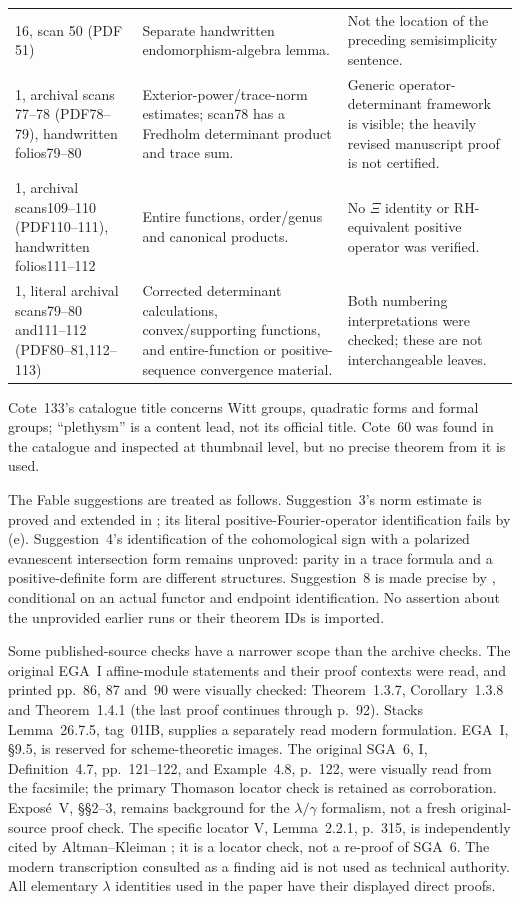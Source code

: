 {\begin{longtable}{p{.19\linewidth}p{.36\linewidth}p{.37\linewidth}}
16, scan 50 (PDF 51)&Separate handwritten endomorphism-algebra lemma.&Not the location of the preceding semisimplicity sentence.\\
1, archival scans 77--78 (PDF78--79), handwritten folios79--80&Exterior-power/trace-norm estimates; scan78 has a Fredholm determinant product and trace sum.&Generic operator-determinant framework is visible; the heavily revised manuscript proof is not certified.\\
1, archival scans109--110 (PDF110--111), handwritten folios111--112&Entire functions, order/genus and canonical products.&No $\Xi$ identity or RH-equivalent positive operator was verified.\\
1, literal archival scans79--80 and111--112 (PDF80--81,112--113)&Corrected determinant calculations, convex/supporting functions, and entire-function or positive-sequence convergence material.&Both numbering interpretations were checked; these are not interchangeable leaves.\\\bottomrule
\end{longtable}}
Cote~133's catalogue title concerns Witt groups, quadratic forms and formal groups; ``plethysm'' is a content lead, not its official title. Cote~60 was found in the catalogue and inspected at thumbnail level, but no precise theorem from it is used.

The Fable suggestions are treated as follows. Suggestion~3's norm estimate is proved and extended in ; its literal positive-Fourier-operator identification fails by (e). Suggestion~4's identification of the cohomological sign with a polarized evanescent intersection form remains unproved: parity in a trace formula and a positive-definite form are different structures. Suggestion~8 is made precise by , conditional on an actual functor and endpoint identification. No assertion about the unprovided earlier runs or their theorem IDs is imported.

Some published-source checks have a narrower scope than the archive checks.
The original EGA~I affine-module statements and their proof
contexts were read, and printed pp.~86, 87 and~90 were visually
checked: Theorem~1.3.7, Corollary~1.3.8 and Theorem~1.4.1
(the last proof continues through p.~92). Stacks Lemma~26.7.5,
tag~01IB, supplies a separately read modern formulation.
EGA~I, \S9.5, is reserved for scheme-theoretic images.
The original SGA~6, I, Definition~4.7, pp.~121--122, and
Example~4.8, p.~122, were visually read from the facsimile;
the primary Thomason locator check
\cite[\S3.1, pp.~8--9]{ThomasonPerfect} is retained as
corroboration. Expos\'e~V, \S\S2--3, remains background for
the $\lambda/\gamma$ formalism, not a fresh original-source
proof check. The specific locator V, Lemma~2.2.1, p.~315, is independently cited by Altman--Kleiman \cite[\S2.10]{AK}; it is a locator check, not a re-proof of SGA~6. The modern transcription consulted as a finding aid is not used as technical authority. All elementary $\lambda$ identities used in the paper have their displayed direct proofs.

